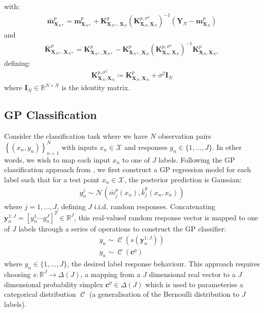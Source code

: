 \documentclass{article}
\newcommand{\Cat}{\operatorname{\mathcal{C}}}
\numberwithin{equation}{section}
\begin{document}
with:
\begin{align}
    \label{gp-posterior-mean}
    \bar{\mathbf{m}}^p_{\mathbf{X}_{N*}} = \mathbf{m}^p_{\mathbf{X}_{N*}} + \mathbf{K}^p_{\mathbf{X}_{N*}, \mathbf{X}_N} \left( \mathbf{K}^{p, \sigma^2}_{\mathbf{X}_N, \mathbf{X}_N}\right)^{-1} \left( \mathbf{Y}_N - \mathbf{m}^p_{\mathbf{X}_N}\right)
\end{align}
and
\begin{align}
    \label{gp-posterior-covariance}
    \bar{\mathbf{K}}^p_{\mathbf{X}_{N*}, \mathbf{X}_{N*}} = \mathbf{K}^p_{\mathbf{X}_{N*}, \mathbf{X}_{N*}} - \mathbf{K}^p_{\mathbf{X}_{N*}, \mathbf{X}_N}\left( \mathbf{K}^{p, \sigma^2}_{\mathbf{X}_N, \mathbf{X}_N}\right)^{-1}\mathbf{K}^p_{\mathbf{X}_N, \mathbf{X}_{N*}}
\end{align}
defining:
\begin{align}
    \mathbf{K}^{p, \sigma^2}_{\mathbf{X}_N, \mathbf{X}_N} \coloneqq \mathbf{K}^p_{\mathbf{X}_N, \mathbf{X}_N} + \sigma^2 \mathbf{I}_N
    \label{gp-covariance-with-sigma}
\end{align}
where $\mathbf{I}_N \in \mathbb{R}^{N \times N}$ is the identity matrix.

\subsection{GP Classification}\label{section:gp-classifiers}
Consider the classification task where we have $N$ observation pairs $\left\{(x_n, y_n)\right\}_{n=1}^{N}$ with inputs $x_n \in \mathcal{X}$ and responses $y_n \in \{1, \dots, J\}$. In other words, we wish to map each input $x_n$ to one of $J$ labels. Following the GP classification approach from \cite{matthews2017scalable}, we first construct a GP regression model for each label such that for a test point $x_n \in \mathcal{X}$, the posterior prediction is Gaussian:
\begin{align}
    y_n^j \sim \mathcal{N}\left(\bar{m}^p_j(x_n), \bar{k}^p_j(x_n, x_n)\right)
    \label{gp-classifier-regressors}
\end{align}
where $j=1, \dots, J$, defining $J$ i.i.d. random responses.
Concatenating $\mathbf{y}_n^{1:J} = [y_n^1 \cdots y_n^J]^T \in \mathbb{R}^{J}$, this real-valued random response vector is mapped to one of $J$ labels through a series of operations to construct the GP classifier:
\begin{align}
\label{gp-classifier}
y_n \sim \Cat \left(s\left(\mathbf{y}_n^{1:J}\right)\right) \\
y_n \sim \Cat \left(\mathbf{c}^p\right)
\label{gp-classifier}
\end{align}
where $y_n \in \{1, \dots, J\}$, the desired label response behaviour. This approach requires choosing $s: \mathbb{R}^J \rightarrow \Delta(J)$, a mapping from a $J$ dimensional real vector to a $J$ dimensional probability simplex $\mathbf{c}^p \in \Delta(J)$ which is used to parameterise a categorical distribution $\Cat$ (a generalisation of the Bernoulli distribution to $J$ labels).
\end{document}
